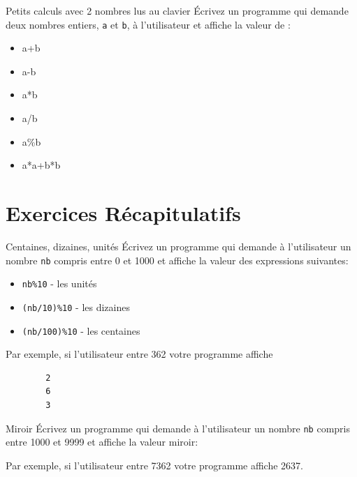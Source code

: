 \documentclass[a4paper,11pt]{article}
\begin{document}
	\begin{Exercice}{Petits calculs avec 2 nombres lus au clavier} 
		\'Ecrivez un programme qui demande 
		deux nombres entiers, \texttt{a} et \texttt{b}, à l'utilisateur et affiche la valeur de :
		\begin{itemize}
		 	\item a+b
			\item a-b
			\item a*b
			\item a/b
			\item a\%b
			\item a*a+b*b
		\end{itemize} 
	\end{Exercice}


\section{Exercices Récapitulatifs}

%
		
	\begin{Exercice}{Centaines, dizaines, unités} 
		\'Ecrivez un programme qui demande à l'utilisateur 
		un nombre \texttt{nb} compris entre 0 et 1000 et affiche la valeur des expressions suivantes:
		\begin{itemize}
			\item \texttt{nb\%10} - les unités
			\item \texttt{(nb/10)\%10} - les dizaines
			\item \texttt{(nb/100)\%10} - les centaines
		\end{itemize}
		Par exemple, si l'utilisateur entre 362 votre programme affiche
		\begin{verbatim}
		2
		6
		3
		\end{verbatim}
	\end{Exercice}	

	\begin{Exercice}{Miroir} 
		\'Ecrivez un programme qui demande à l'utilisateur 
		un nombre \texttt{nb} compris entre 1000 et 9999 et affiche la valeur miroir:

		Par exemple, si l'utilisateur entre 7362 votre programme affiche 2637.
	\end{Exercice}	
\end{document}
